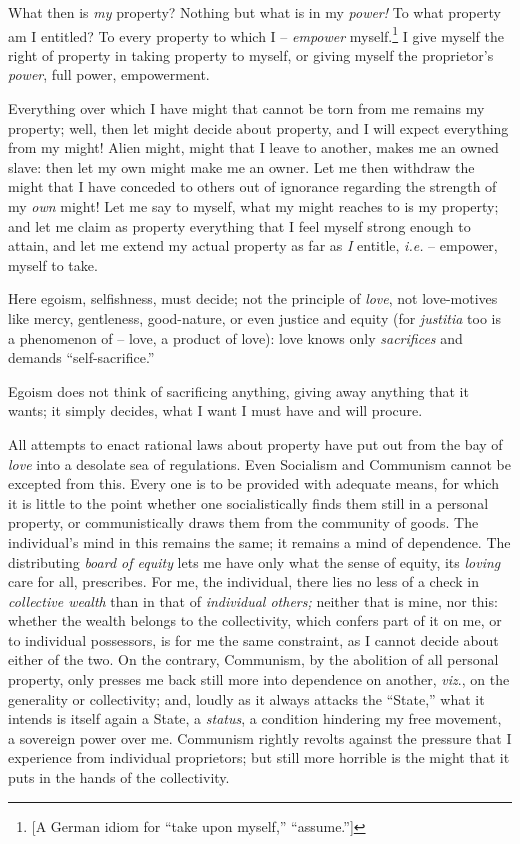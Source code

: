 What then is \textit{my} property? Nothing but what is in my \textit{power!} 
To what property am I entitled? To every property to which I -- 
\textit{empower} myself.\footnote{[A German idiom for ``take upon myself,'' 
``assume.'']} I give myself the right of property in taking property to 
myself, or giving myself the proprietor's \textit{power}, full power, 
empowerment.

Everything over which I have might that cannot be torn from me remains my 
property; well, then let might decide about property, and I will expect 
everything from my might! Alien might, might that I leave to another, makes me 
an owned slave: then let my own might make me an owner. Let me then withdraw 
the might that I have conceded to others out of ignorance regarding the 
strength of my \textit{own} might! Let me say to myself, what my might reaches 
to is my property; and let me claim as property everything that I feel myself 
strong enough to attain, and let me extend my actual property as far as 
\textit{I} entitle, \textit{i.e.} -- empower, myself to take.

Here egoism, selfishness, must decide; not the principle of \textit{love}, not 
love-motives like mercy, gentleness, good-nature, or even justice and equity 
(for \textit{justitia} too is a phenomenon of -- love, a product of love): 
love knows only \textit{sacrifices} and demands ``self-sacrifice.''

Egoism does not think of sacrificing anything, giving away anything that it 
wants; it simply decides, what I want I must have and will procure.

All attempts to enact rational laws about property have put out from the bay 
of \textit{love} into a desolate sea of regulations. Even Socialism and 
Communism cannot be excepted from this. Every one is to be provided with 
adequate means, for which it is little to the point whether one 
socialistically finds them still in a personal property, or communistically 
draws them from the community of goods. The individual's mind in this remains 
the same; it remains a mind of dependence. The distributing \textit{board of 
equity} lets me have only what the sense of equity, its \textit{loving} care 
for all, prescribes. For me, the individual, there lies no less of a check in 
\textit{collective wealth} than in that of \textit{individual others;} neither 
that is mine, nor this: whether the wealth belongs to the collectivity, which 
confers part of it on me, or to individual possessors, is for me the same 
constraint, as I cannot decide about either of the two. On the contrary, 
Communism, by the abolition of all personal property, only presses me back 
still more into dependence on another, \textit{viz}., on the generality or 
collectivity; and, loudly as it always attacks the ``State,'' what it 
intends is itself again a State, a \textit{status}, a condition hindering my 
free movement, a sovereign power over me. Communism rightly revolts against 
the pressure that I experience from individual proprietors; but still more 
horrible is the might that it puts in the hands of the collectivity.

